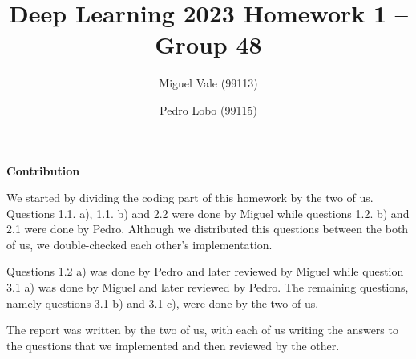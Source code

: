 \documentclass[12pt]{article}
\title{\large{Deep Learning 2023}\vskip 0.2cm Homework 1 -- Group 48}
\date{}
\author{Miguel Vale (99113) \and Pedro Lobo (99115)}
\begin{document}
\maketitle

\center\large{\vskip -1.0cm\textbf{Contribution}}

\begin{justify}
    We started by dividing the coding part of this homework by the two of us. Questions 1.1. a), 1.1. b) and 2.2 were done by Miguel while questions 1.2. b) and 2.1 were done by Pedro. Although we distributed this questions between the both of us, we double-checked each other's implementation.

    Questions 1.2 a) was done by Pedro and later reviewed by Miguel while question 3.1 a) was done by Miguel and later reviewed by Pedro. The remaining questions, namely questions 3.1 b) and 3.1 c), were done by the two of us.

    The report was written by the two of us, with each of us writing the answers to the questions that we implemented and then reviewed by the other.
\end{justify}
\end{document}
